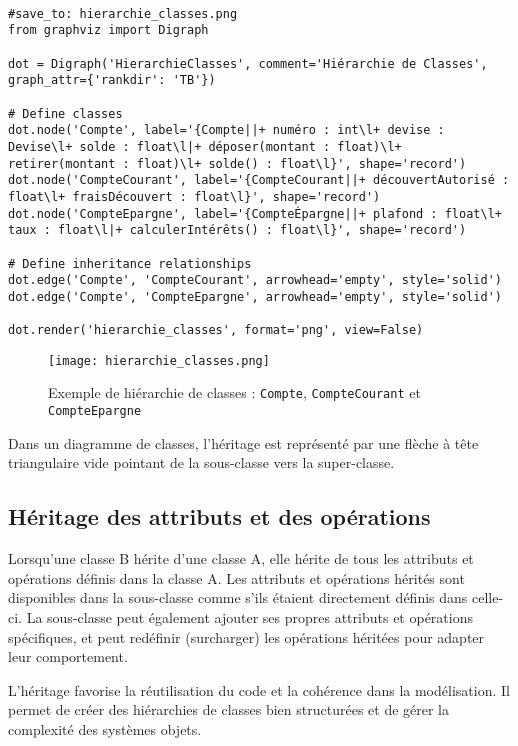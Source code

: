 \documentclass{article}
\begin{document}
\begin{verbatim}

#save_to: hierarchie_classes.png
from graphviz import Digraph

dot = Digraph('HierarchieClasses', comment='Hiérarchie de Classes', graph_attr={'rankdir': 'TB'})

# Define classes
dot.node('Compte', label='{Compte||+ numéro : int\l+ devise : Devise\l+ solde : float\l|+ déposer(montant : float)\l+ retirer(montant : float)\l+ solde() : float\l}', shape='record')
dot.node('CompteCourant', label='{CompteCourant||+ découvertAutorisé : float\l+ fraisDécouvert : float\l}', shape='record')
dot.node('CompteEpargne', label='{CompteÉpargne||+ plafond : float\l+ taux : float\l|+ calculerIntérêts() : float\l}', shape='record')

# Define inheritance relationships
dot.edge('Compte', 'CompteCourant', arrowhead='empty', style='solid')
dot.edge('Compte', 'CompteEpargne', arrowhead='empty', style='solid')

dot.render('hierarchie_classes', format='png', view=False)
\end{verbatim}

\begin{figure}[h]
    \centering
    \texttt{[image: hierarchie\_classes.png]}
    \caption{Exemple de hiérarchie de classes : \texttt{Compte}, \texttt{CompteCourant} et \texttt{CompteEpargne}}
    \label{fig:hierarchie_classes}
\end{figure}

Dans un diagramme de classes, l'héritage est représenté par une flèche à tête triangulaire vide pointant de la sous-classe vers la super-classe.

\subsection{Héritage des attributs et des opérations}
Lorsqu'une classe B hérite d'une classe A, elle hérite de tous les attributs et opérations définis dans la classe A.  Les attributs et opérations hérités sont disponibles dans la sous-classe comme s'ils étaient directement définis dans celle-ci.  La sous-classe peut également ajouter ses propres attributs et opérations spécifiques, et peut redéfinir (surcharger) les opérations héritées pour adapter leur comportement.

L'héritage favorise la réutilisation du code et la cohérence dans la modélisation. Il permet de créer des hiérarchies de classes bien structurées et de gérer la complexité des systèmes objets.
\end{document}
